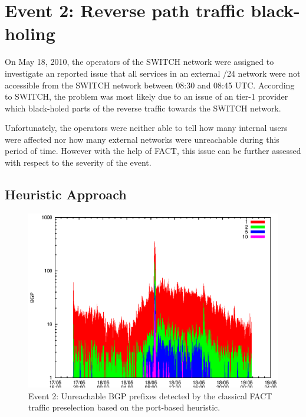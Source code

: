 \section{Event 2: Reverse path traffic black-holing}

On May 18, 2010, the operators of the SWITCH network were assigned to investigate an reported issue that all services in an external /24 network were not accessible from the SWITCH network between 08:30 and 08:45 UTC. According to SWITCH, the problem was most likely due to an issue of an tier-1 provider which black-holed parts of the reverse traffic towards the SWITCH network\citep{SchatzmannPAM2011}.

Unfortunately, the operators were neither able to tell how many internal users were affected nor how many external networks were unreachable during this period of time. However with the help of FACT, this issue can be further assessed with respect to the severity of the event\citep{SchatzmannPAM2011}.

\subsection{Heuristic Approach}

\begin{figure}
	[p] \centering 
	\includegraphics[width=0.75\linewidth]{images/events/2010_05_18/bgp_log_port80_ref.eps}
	\caption{Event 2: Unreachable BGP prefixes detected by the classical FACT traffic preselection based on the port-based heuristic.} 
	\label{fig:TIER1_FACT_REF} 
\end{figure}

